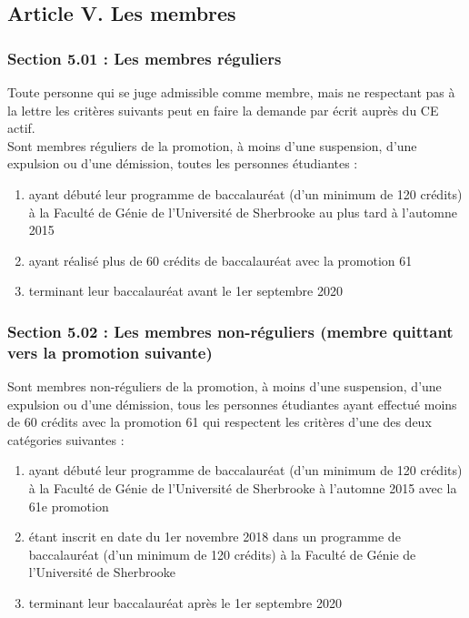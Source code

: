 \subsection*{Article V. Les membres}

\subsubsection*{Section 5.01 : Les membres réguliers}
Toute personne qui se juge admissible comme membre, mais ne respectant pas à la lettre les critères suivants peut en faire la demande par écrit auprès du CE actif.\\

Sont membres réguliers de la promotion, à moins d'une suspension, d'une expulsion ou d'une démission, toutes les personnes étudiantes :
\begin{enumerate}
\item ayant débuté leur programme de baccalauréat (d’un minimum de 120 crédits) à la Faculté de Génie de l'Université de Sherbrooke au plus tard à l’automne 2015
\item ayant réalisé plus de 60 crédits de baccalauréat avec la promotion 61
\item terminant leur baccalauréat avant le 1er septembre 2020
\end{enumerate}

\subsubsection*{Section 5.02 : Les membres non-réguliers (membre quittant vers la promotion suivante)}
Sont membres non-réguliers de la promotion, à moins d'une suspension, d'une expulsion ou d'une démission, tous les personnes étudiantes ayant effectué moins de 60 crédits avec la promotion 61 qui respectent les critères d’une des deux catégories suivantes : 

\begin{enumerate}
\item ayant débuté leur programme de baccalauréat (d’un minimum de 120 crédits) à la Faculté de Génie de l'Université de Sherbrooke à l’automne 2015 avec la 61e promotion
\item étant inscrit en date du 1er novembre 2018 dans un programme de baccalauréat (d’un minimum de 120 crédits) à la Faculté de Génie de l’Université de Sherbrooke
\item terminant leur baccalauréat après le 1er septembre 2020
\end{enumerate}

